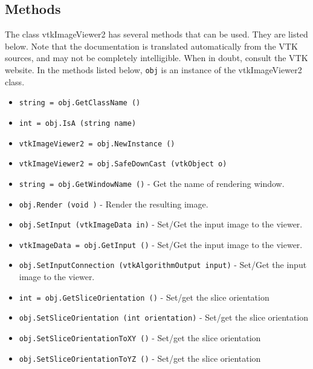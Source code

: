 \subsection{Methods}

The class vtkImageViewer2 has several methods that can be used.
  They are listed below.
Note that the documentation is translated automatically from the VTK sources,
and may not be completely intelligible.  When in doubt, consult the VTK website.
In the methods listed below, \verb|obj| is an instance of the vtkImageViewer2 class.
\begin{itemize}
\item  \verb|string = obj.GetClassName ()|

\item  \verb|int = obj.IsA (string name)|

\item  \verb|vtkImageViewer2 = obj.NewInstance ()|

\item  \verb|vtkImageViewer2 = obj.SafeDownCast (vtkObject o)|

\item  \verb|string = obj.GetWindowName ()| -  Get the name of rendering window.

\item  \verb|obj.Render (void )| -  Render the resulting image.

\item  \verb|obj.SetInput (vtkImageData in)| -  Set/Get the input image to the viewer.

\item  \verb|vtkImageData = obj.GetInput ()| -  Set/Get the input image to the viewer.

\item  \verb|obj.SetInputConnection (vtkAlgorithmOutput input)| -  Set/Get the input image to the viewer.

\item  \verb|int = obj.GetSliceOrientation ()| -  Set/get the slice orientation

\item  \verb|obj.SetSliceOrientation (int orientation)| -  Set/get the slice orientation

\item  \verb|obj.SetSliceOrientationToXY ()| -  Set/get the slice orientation

\item  \verb|obj.SetSliceOrientationToYZ ()| -  Set/get the slice orientation


\end{itemize}

